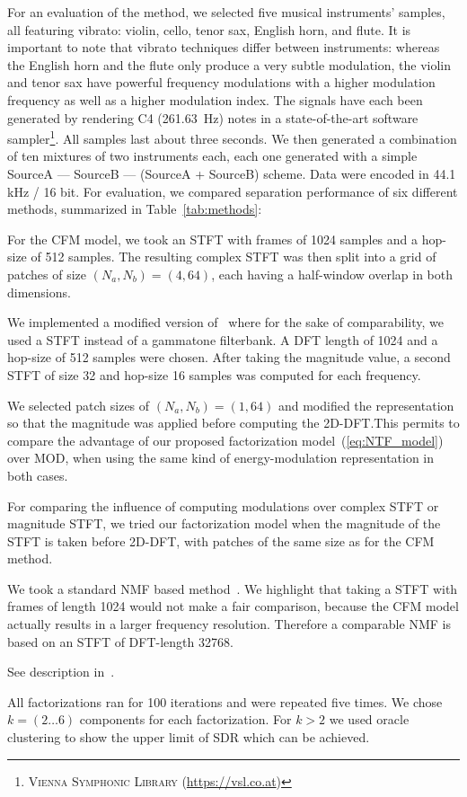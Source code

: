 For an evaluation of the method, we selected five musical instruments' samples, all featuring vibrato: violin, cello, tenor sax, English horn, and flute. It is important to note that vibrato techniques differ between instruments: whereas the English horn and the flute only produce a very subtle modulation, the violin and tenor sax have powerful frequency modulations with a higher modulation frequency as well as a higher modulation index. The signals have each been generated by rendering C4 (261.63~Hz) notes in a state-of-the-art software sampler\footnote{\textsc{Vienna Symphonic Library} (\url{https://vsl.co.at})}. All samples last about three seconds. We then generated a combination of ten mixtures of two instruments each, each one generated with a simple SourceA --- SourceB --- (SourceA + SourceB) scheme. Data were encoded in 44.1 kHz / 16 bit.
For evaluation, we compared separation performance of six different methods, summarized in Table~\ref{tab:methods}:
\begin{description}[style=unboxed,leftmargin=0cm]
\item[CFM] For the CFM model, we took an STFT with frames of 1024 samples and a hop-size of 512 samples. The resulting complex STFT was then split into a grid of patches of size $(N_a, N_b) = (4, 64)$, each having a half-window overlap in both dimensions.
\item[MOD] We implemented a modified version of~\cite{barker13} where for the sake of comparability, we used a STFT instead of a gammatone filterbank. A DFT length of 1024 and a hop-size of 512 samples were chosen. After taking the magnitude value, a second STFT of size 32 and hop-size 16 samples was computed for each frequency.
\item[CFMMOD] We selected patch sizes of $(N_a, N_b) = (1, 64)$ and modified the representation so that the magnitude was applied before computing the 2D-DFT.\@ This permits to compare the advantage of our proposed factorization model~(\ref{eq:NTF_model}) over MOD, when using the same kind of energy-modulation representation in both cases.
\item[CFMM] For comparing the influence of computing modulations over complex STFT or magnitude STFT, we tried our factorization model when the magnitude of the STFT is taken before 2D-DFT, with patches of the same size as for the CFM method.
\item[NMF] We took a standard NMF based method~\cite{virtanen07}. We highlight that taking a STFT with frames of length 1024 would not make a fair comparison, because the CFM model actually results in a larger frequency resolution. Therefore a comparable NMF is based on an STFT of DFT-length 32768.
\item[HR-NMF] See description in~\cite{magron15a}.
\end{description}
All factorizations ran for 100 iterations and were repeated five times. We chose $k=(2\ldots6)$ components for each factorization. For $k > 2$ we used oracle clustering to show the upper limit of SDR which can be achieved.

